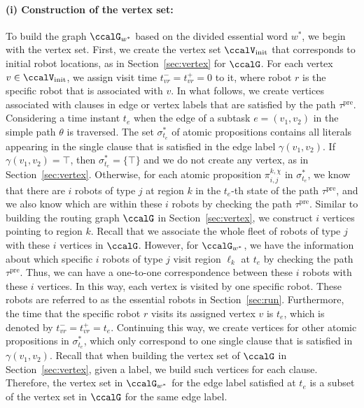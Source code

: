 \documentclass[Afour,sageh,times]{sagej}
\renewcommand{\ap}[3]{\mathcal{\pi}_{{#1},{#2}}^{#3}}
\begin{document}
{{\paragraph{(i) Construction of the vertex set:}\label{app:vertex} To build the graph $\ccalG_{w^*}$ based on the divided  essential word  $w^*$, we begin with the vertex set. First, we create the vertex set $\ccalV_{\text{init}}$ that corresponds to initial robot locations, as in Section~\ref{sec:vertex} for $\ccalG$. For each vertex $v \in \ccalV_{\text{init}}$, we assign visit time $t_{vr}^- = t_{vr}^+ = 0$ to it,  where robot $r$ is the specific robot that is associated with $v$. In what follows, we create vertices associated with clauses in edge or vertex labels that are satisfied by the path $\tau^\text{pre}$. Considering a time instant $t_e$ when the edge of a subtask  $e = (v_1, v_2)$ in the simple path $\theta$ is traversed. The set $\sigma_{t_e}^*$ of atomic propositions  contains all literals appearing in the single clause that is satisfied in the edge label $\gamma(v_1, v_2)$. If $\gamma(v_1, v_2) = \top$, then $\sigma_{t_e}^* = \{\top\}$ and we do not create any vertex, as in Section~\ref{sec:vertex}. Otherwise, for each atomic proposition $\ap{i}{j}{k,\chi}$ in $\sigma_{t_e}^*$, we know that there are $i$ robots of type $j$ at region $k$ in the $t_e$-th state of the path $\tau^\text{pre}$, and we also know which are within these $i$ robots by checking the path $\tau^\text{pre}$. Similar to building the routing graph $\ccalG$ in Section~\ref{sec:vertex}, we construct $i$ vertices pointing to region $k$. Recall that we associate the whole fleet of robots of type $j$ with these $i$ vertices in $\ccalG$. However, for $\ccalG_{w^*}$, we have the information about which specific $i$ robots of type $j$ visit region $\ell_k$ at $t_e$ by checking the path $\tau^\text{pre}$. Thus, we can have a one-to-one correspondence between these $i$ robots with these $i$ vertices. In this way, each vertex is visited by one specific robot. These robots are referred to as the essential robots in Section~\ref{sec:run}. Furthermore, the time that the specific  robot $r$ visits its assigned vertex $v$ is $t_e$, which is denoted by $t_{vr}^- = t_{vr}^+ = t_e$. Continuing this way, we create vertices for other atomic propositions in $\sigma_{t_e}^*$, which only correspond to one single clause that is satisfied in $\gamma(v_1, v_2)$. Recall that when building the vertex set of $\ccalG$ in Section~\ref{sec:vertex}, given a label, we build such vertices for each clause. Therefore, the vertex set in $\ccalG_{w^*}$ for the edge label satisfied at $t_e$ is a subset of the vertex set in $\ccalG$ for the same edge label.

}}
\end{document}
